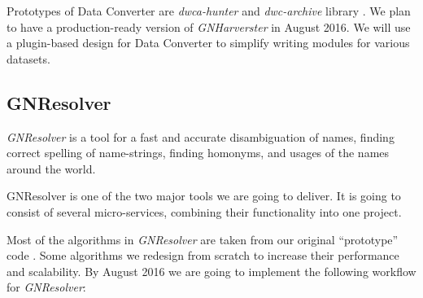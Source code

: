 \documentclass[11pt]{article}
\begin{document}
Prototypes of Data Converter are \textit{dwca-hunter} \cite{dwca-hunter} and
\textit{dwc-archive} library \cite{dwc-archive}.  We plan to have a
production-ready version of \textit{GNHarverster} in August 2016. We will use
a plugin-based design for Data Converter to simplify writing modules for
various datasets.

\subsection{GNResolver}

\textit{GNResolver} \cite{gnresolver} is a tool for a fast and accurate
disambiguation of names, finding correct spelling of name-strings, finding
homonyms, and usages of the names around the world.

GNResolver is one of the two major tools we are going to deliver. It is
going to consist of several micro-services, combining their functionality into
one project.

Most of the algorithms in \textit{GNResolver} are taken from our original
``prototype'' code \cite{resolver:gn, gnrd}. Some algorithms we redesign from scratch to
increase their performance and scalability. By August 2016 we are going
to implement the following workflow for \textit{GNResolver}:
\end{document}
